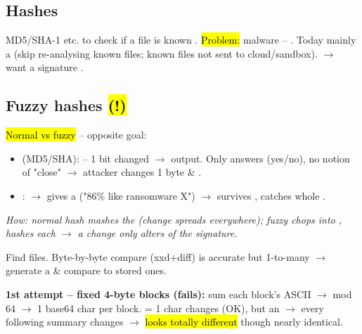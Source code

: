 \subsection{Hashes}
MD5/SHA-1 etc. to check if a file is known . \hl{Problem:}  malware -- . Today mainly a  (skip re-analysing known files; known files not sent to cloud/sandbox). $\to$ want a signature .

\subsection{Fuzzy hashes \hl{(!)}}
\hl{Normal vs fuzzy} -- opposite goal:
\begin{itemize}
\item {} (MD5/SHA):  -- 1 bit changed $\to$  output. Only answers  (yes/no), no notion of "close" $\to$ attacker changes 1 byte \& .
\item {}:  $\to$ gives a  ("86\% like ransomware X") $\to$ survives , catches whole .
\end{itemize}
\textit{How: normal hash mashes the  (change spreads everywhere); fuzzy chops into , hashes each $\to$ a change only alters  of the signature.}

Find  files. Byte-by-byte compare (xxd+diff) is accurate but  1-to-many $\to$ generate a  \& compare to stored ones.

\textbf{1st attempt -- fixed 4-byte blocks (fails):} sum each block's ASCII $\to$ mod 64 $\to$ 1 base64 char per block.  = 1 char changes (OK), but an  $\to$ every following summary changes $\to$ \hl{looks totally different} though nearly identical.

